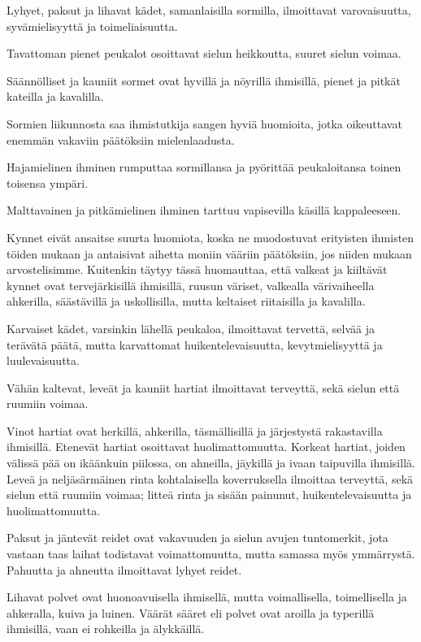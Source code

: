 \documentclass[11pt, twoside, finnish, a5paper]{book}
\begin{document}
Lyhyet, paksut ja lihavat kädet, samanlaisilla sormilla,
ilmoittavat varovaisuutta, syvämielisyyttä ja toimeliaisuutta.

Tavattoman pienet peukalot osoittavat sielun heikkoutta,
suuret sielun voimaa.

Säännölliset ja kauniit sormet ovat hyvillä ja nöyrillä
ihmisillä, pienet ja pitkät kateilla ja kavalilla.

Sormien liikunnosta saa ihmistutkija sangen hyviä
huomioita, jotka oikeuttavat enemmän vakaviin
päätöksiin mielenlaadusta.

Hajamielinen ihminen rumputtaa sormillansa ja 
pyörittää peukaloitansa toinen toisensa ympäri.

Malttavainen ja pitkämielinen ihminen tarttuu 
vapisevilla käsillä kappaleeseen.

Kynnet eivät ansaitse suurta huomiota, koska ne muodostuvat
erityisten ihmisten töiden mukaan ja antaisivat
aihetta moniin vääriin päätöksiin, jos niiden mukaan
arvostelisimme. Kuitenkin täytyy tässä huomauttaa, että
valkeat ja kiiltävät kynnet ovat tervejärkisillä ihmisillä,
ruusun väriset, valkealla värivaiheella ahkerilla, säästävillä
ja uskollisilla, mutta keltaiset riitaisilla ja kavalilla.

Karvaiset kädet, varsinkin lähellä peukaloa, ilmoittavat
tervettä, selvää ja terävätä päätä, mutta karvattomat
huikentelevaisuutta, kevytmielisyyttä ja luulevaisuutta.

Vähän kaltevat, leveät ja kauniit hartiat ilmoittavat
terveyttä, sekä sielun että ruumiin voimaa.

Vinot hartiat ovat herkillä, ahkerilla, täsmällisillä ja
järjestystä rakastavilla ihmisillä.
Etenevät hartiat osoittavat huolimattomuutta. Korkeat
hartiat, joiden välissä pää on ikäänkuin piilossa, on
ahneilla, jäykillä ja ivaan taipuvilla ihmisillä.
Leveä ja neljäsärmäinen rinta kohtalaisella
koverruksella ilmoittaa terveyttä, sekä sielun että ruumiin voimaa;
litteä rinta ja sisään painunut, huikentelevaisuutta 
ja huolimattomuutta.

Paksut ja jäntevät reidet ovat vakavuuden ja sielun
avujen tuntomerkit, jota vastaan taas laihat todistavat
voimattomuutta, mutta samassa myös ymmärrystä.
Pahuutta ja ahneutta ilmoittavat lyhyet reidet.

Lihavat polvet ovat huonoavuisella ihmisellä, mutta
voimallisella, toimellisella ja ahkeralla, kuiva ja luinen.
Väärät sääret eli polvet ovat aroilla ja typerillä ihmisillä,
vaan ei rohkeilla ja älykkäillä.
\end{document}
